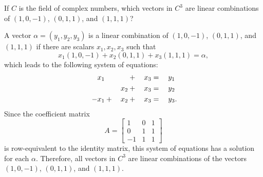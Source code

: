  If $C$ is the field of complex numbers, which vectors in
$C^3$ are linear combinations of $(1,0,-1)$, $(0,1,1)$, and $(1,1,1)$?
\begin{solution}
  A vector $\alpha = (y_1,y_2,y_3)$ is a linear combination of
  $(1,0,-1)$, $(0,1,1)$, and $(1,1,1)$ if there are scalars
  $x_1,x_2,x_3$ such that
  \begin{equation*}
    x_1(1, 0, -1) + x_2(0, 1, 1) + x_3(1, 1, 1) = \alpha,
  \end{equation*}
  which leads to the following system of equations:
  \begin{alignat*}{4}
    \phantom{{}-}x_1 &&  &{}+{}& x_3 &{}={}& y_1 \\
    && x_2 &{}+{}& x_3 &{}={}& y_2 \\
    -x_1 &{}+{}& x_2 &{}+{}& x_3 &{}={}& y_3\rlap.
  \end{alignat*}
  Since the coefficient matrix
  \begin{equation*}
    A =
    \begin{bmatrix}
      1 & 0 & 1 \\
      0 & 1 & 1 \\
      -1 & 1 & 1
    \end{bmatrix}
  \end{equation*}
  is row-equivalent to the identity matrix, this system of equations
  has a solution for each $\alpha$. Therefore, all vectors in $C^3$
  are linear combinations of the vectors $(1,0,-1)$, $(0,1,1)$, and
  $(1,1,1)$.
\end{solution}
